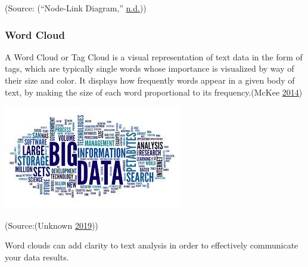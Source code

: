 \documentclass[]{book}
\begin{document}
(Source: (``Node-Link Diagram,'' \protect\hyperlink{ref-node-link-diag}{n.d.}))

\hypertarget{word-cloud}{%
\subsubsection{Word Cloud}\label{word-cloud}}

A Word Cloud or Tag Cloud is a visual representation of text data in the form of tags, which are typically single words whose importance is visualized by way of their size and color. It displays how frequently words appear in a given body of text, by making the size of each word proportional to its frequency.(McKee \protect\hyperlink{ref-wordcloud}{2014})

\includegraphics{images/WordCloud.jpg}

(Source:(Unknown \protect\hyperlink{ref-wordCloudimage}{2019}))

Word clouds can add clarity to text analysis in order to effectively communicate your data results.
\end{document}
